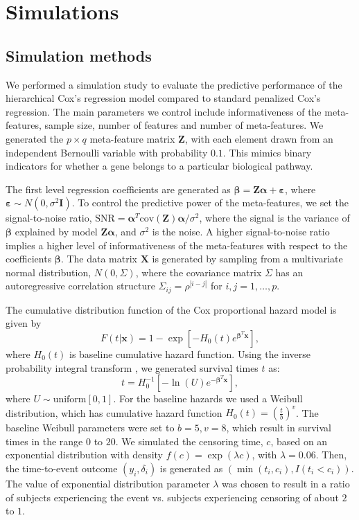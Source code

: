 \section{Simulations}
\subsection{Simulation methods}
We performed a simulation study to evaluate the predictive performance of the hierarchical Cox’s regression model compared to standard penalized Cox’s regression. The main parameters we control include informativeness of the meta-features, sample size, number of features and number of meta-features. We generated the $p\times q$ meta-feature matrix $\bm{Z}$, with each element drawn from an independent Bernoulli variable with probability $0.1$. This mimics binary indicators for whether a gene belongs to a particular biological pathway.  

The first level regression coefficients are generated as $\bm{\beta}=\bm{Z\alpha}+\bm{\varepsilon}$, where $\bm{\varepsilon} \sim N(0, \sigma^2\bm{I})$. To control the predictive power of the meta-features, we set the signal-to-noise ratio, $\text{SNR}=\bm{\alpha}^T\text{cov}(\bm{Z})\bm{\alpha}/\sigma^2$, where the signal is the variance of $\bm{\beta}$ explained by model $\bm{Z\alpha}$, and $\sigma^2$ is the noise. A higher signal-to-noise ratio implies a higher level of informativeness of the meta-features with respect to the coefficients $\bm{\beta}$. The data matrix $\bm{X}$ is generated by sampling from a multivariate normal distribution, $N(0,\Sigma)$, where the covariance matrix $\Sigma$ has an autoregressive correlation structure $\Sigma_{ij}=\rho^{|i-j|}$ for $i,j=1,\dots,p$.

The cumulative distribution function of the Cox proportional hazard model is given by
\begin{equation*}
    F(t|\bm{x})=1-\exp\left[-H_0(t)e^{\bm{\beta}^T\bm{x}}\right],
\end{equation*}
where $H_0(t)$ is baseline cumulative hazard function. Using the inverse probability integral transform \citep{bender2005generating}, we generated survival times $t$ as:
\begin{equation}
    t=H_0^{-1}\left[-\ln(U)e^{-\bm{\beta}^T\bm{x}}\right], \label{eq2.10}
\end{equation}
where $U\sim \text{uniform}[0,1]$. For the baseline hazards we used a Weibull distribution, which has cumulative hazard function $H_0(t)=(\frac{t}{b})^v$. The baseline Weibull parameters were set to $b=5,v=8$, which result in survival times in the range $0$ to $20$. We simulated the censoring time, $c$, based on an exponential distribution with density $f(c)=\exp(\lambda c)$, with $\lambda=0.06$. Then, the time-to-event outcome $(y_i,\delta_i)$ is generated as $(\min(t_i,c_i),I(t_i<c_i))$. The value of exponential distribution parameter $\lambda$ was chosen to result in a ratio of subjects experiencing the event vs. subjects experiencing censoring of about $2$ to $1$.

